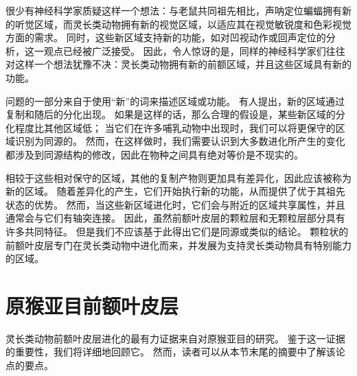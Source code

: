 很少有神经科学家质疑这样一个想法：与老鼠共同祖先相比，声呐定位蝙蝠拥有新的听觉区域，而灵长类动物拥有新的视觉区域，以适应其在视觉敏锐度和色彩视觉方面的需求。
同时，这些新区域支持新的功能，如对凹视动作或回声定位的分析，这一观点已经被广泛接受。
因此，令人惊讶的是，同样的神经科学家们往往对这样一个想法犹豫不决：灵长类动物拥有新的前额区域，并且这些区域具有新的功能。


问题的一部分来自于使用“新”的词来描述区域或功能。
有人提出，新的区域通过复制和随后的分化出现\cite{krubitzer2000arealization}。
如果是这样的话，那么合理的假设是，某些新区域的分化程度比其他区域低；
当它们在许多哺乳动物中出现时，我们可以将更保守的区域识别为同源的。
然而，在这样做时，我们需要认识到大多数进化所产生的变化都涉及到同源结构的修改，因此在物种之间具有绝对等价是不现实的。


相较于这些相对保守的区域，其他的复制产物则更加具有差异化，因此应该被称为新的区域。
随着差异化的产生，它们开始执行新的功能，从而提供了优于其祖先状态的优势。
然而，当这些新区域进化时，它们会与附近的区域共享属性，并且通常会与它们有轴突连接。
因此，虽然前额叶皮层的颗粒层和无颗粒层部分具有许多共同特征。
但是我们不应该基于此得出它们是同源或类似的结论。
颗粒状的前额叶皮层专门在灵长类动物中进化而来，并发展为支持灵长类动物具有特别能力的区域。


\section{原猴亚目前额叶皮层}
灵长类动物前额叶皮层进化的最有力证据来自对原猴亚目的研究。
鉴于这一证据的重要性，我们将详细地回顾它。
然而，读者可以从本节末尾的摘要中了解该论点的要点。

